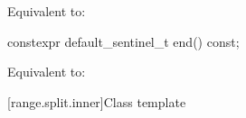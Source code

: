 \begin{itemdescr}
\pnum
\effects
Equivalent to: 
\end{itemdescr}
%
\begin{itemdecl}
constexpr default_sentinel_t end() const;
\end{itemdecl}

\begin{itemdescr}
\pnum
\effects
Equivalent to: 
\end{itemdescr}

[range.split.inner]{Class template }

%
